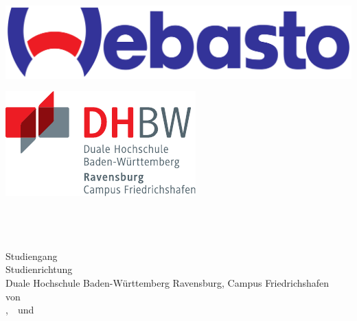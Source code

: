 \thispagestyle{plain}
\hypersetup{pageanchor=false}
\begin{titlepage}
\enlargethispage{4.0cm}
\sffamily 								%

\parbox{0.5\linewidth}{
\begin{flushleft}
\includegraphics[width=0.6\linewidth]{images/Webasto_Logo.png}
\end{flushleft}
}
\parbox{0.5\linewidth}{
\begin{flushright}
	\includegraphics[width=0.6\linewidth]{images/DHBW_d_R_FN_46mm_4c}
	\\[5ex]
\end{flushright}
}
				

\begin{center}

{\fontsize{25.84pt}{17pt}\selectfont
\textbf{\titel}\\[1.5ex]}
{\fontsize{14pt}{17pt}\selectfont
\textbf{\untertitel}\\[5ex]}
{\fontsize{17pt}{20pt}\selectfont
\textbf{\arbeit}\\[2ex]}
{\fontsize{14pt}{17pt}\selectfont
Studiengang \studiengang\\[2ex]}
{\fontsize{12pt}{14pt}\selectfont
Studienrichtung \studienrichtung\\[1ex]
Duale Hochschule Baden-Württemberg Ravensburg, Campus Friedrichshafen\\[5ex]
von\\[1ex]
\autorone,~\autortwo~und~\autorthree \\[15ex]}


\end{center}


\end{titlepage}
